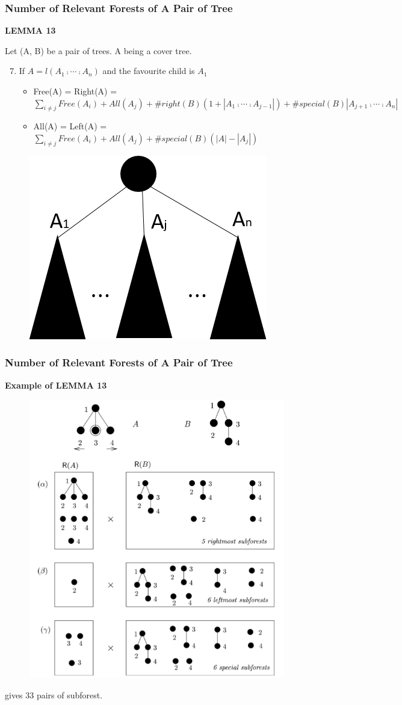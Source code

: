 \documentclass{beamer}
\begin{document}
\begin{frame}
\frametitle{Number of Relevant Forests of A Pair of Tree}
\textbf{LEMMA 13}

Let (A, B) be a pair of trees. A being a cover tree.

\begin{enumerate}[1)]
\setcounter{enumi}{6}
\item If $A=l(A_1 \comp \cdots \comp A_n)$ and the favourite child is $A_1$
\begin{itemize}
\item Free(A) = Right(A) = $\sum_{i\neq j}Free(A_i) + All(A_j) + \#right(B)(1 + \left\vert A_1 \comp \cdots \comp A_{j-1}\right\vert) + \#special(B)\left\vert A_{j+1} \comp \cdots \comp A_n\right\vert$
\item All(A) = Left(A) = $\sum_{i\neq j}Free(A_i) + All(A_j) + \#special(B)(\left\vert A \right\vert - \left\vert A_j \right\vert)$
\end{itemize}
\end{enumerate}


\begin{figure}
	\includegraphics[width=0.4\linewidth]{lemma133}
	\label{LEMMA 13(3)} 
	\centering
\end{figure}
\end{frame}


\begin{frame}
\frametitle{Number of Relevant Forests of A Pair of Tree}
\textbf{Example of LEMMA 13}
\begin{figure}
	\includegraphics[width=0.5\linewidth]{exampleoflemma13}
	\label{Example of Lemma 13} 
	\centering
\end{figure}
gives 33 pairs of subforest.
\end{frame}
\end{document}
